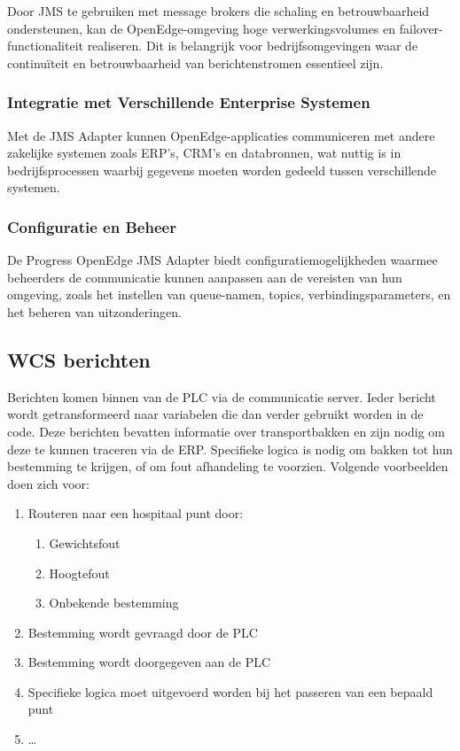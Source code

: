 Door JMS te gebruiken met message brokers die schaling en betrouwbaarheid ondersteunen, kan de OpenEdge-omgeving hoge verwerkingsvolumes en failover-functionaliteit realiseren. 
Dit is belangrijk voor bedrijfsomgevingen waar de continuïteit en betrouwbaarheid van berichtenstromen essentieel zijn.

\subsubsection{Integratie met Verschillende Enterprise Systemen}
Met de JMS Adapter kunnen OpenEdge-applicaties communiceren met andere zakelijke systemen zoals ERP's, CRM’s en databronnen, wat nuttig is in bedrijfsprocessen waarbij gegevens moeten worden gedeeld tussen verschillende systemen.

\subsubsection{Configuratie en Beheer}
De Progress OpenEdge JMS Adapter biedt configuratiemogelijkheden waarmee beheerders de communicatie kunnen aanpassen aan de vereisten van hun omgeving, 
zoals het instellen van queue-namen, topics, verbindingsparameters, en het beheren van uitzonderingen.
 
\subsection{WCS berichten} 
Berichten komen binnen van de PLC via de communicatie server. Ieder bericht wordt getransformeerd naar variabelen die dan verder gebruikt worden in de code.
Deze berichten bevatten informatie over transportbakken en zijn nodig om deze te kunnen traceren via de ERP.
Specifieke logica is nodig om bakken tot hun bestemming te krijgen, of om fout afhandeling te voorzien.
Volgende voorbeelden doen zich voor:
\begin{enumerate}
  \item Routeren naar een hospitaal punt door: 
  \begin{enumerate}
    \item Gewichtsfout
    \item Hoogtefout
    \item Onbekende bestemming
  \end{enumerate}
  \item Bestemming wordt gevraagd door de PLC
  \item Bestemming wordt doorgegeven aan de PLC 
  \item Specifieke logica moet uitgevoerd worden bij het passeren van een bepaald punt
  \item \dots
\end{enumerate}

